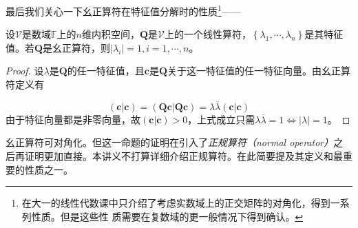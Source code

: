 \documentclass[main.tex]{subfiles}
\begin{document}
最后我们关心一下幺正算符在特征值分解时的性质\footnote{在大一的线性代数课中只介绍了考虑实数域上的正交矩阵的对角化\cite[§5.3 定理 3.7]{周胜林2012线性代数}，得到一系列性质。但是这些性
    质需要在复数域的更一般情况下得到确认。}——
\begin{theorem}
    设$\mathcal{V}$是数域$\mathbb{F}$上的$n$维内积空间，$\mathbf{Q}$是$\mathcal{V}$上的一个线性算符，$\left\{\lambda_1,\cdots,\lambda_n\right\}$是其特征值。若$\mathbf{Q}$是幺正算符，则$\left|\lambda_i\right|=1, i=1,\cdots,n$。
\end{theorem}
\begin{proof}
    设$\lambda$是$\mathbf{Q}$的任一特征值，且$\mathbf{c}$是$\mathbf{Q}$关于这一特征值的任一特征向量。由幺正算符定义有

    \[
        \left(\mathbf{c}|\mathbf{c}\right)=\left(\mathbf{Qc}|\mathbf{Qc}\right)=\lambda\overline{\lambda}\left(\mathbf{c}|\mathbf{c}\right)
    \]
    由于特征向量都是非零向量，故$\left(\mathbf{c}|\mathbf{c}\right)>0$，上式成立只需$\lambda\overline{\lambda}=1\Leftrightarrow\left|\lambda\right|=1$。
\end{proof}

幺正算符可对角化。但这一命题的证明在引入了\emph{正规算符（normal operator）}之后再证明更加直接。本讲义不打算详细介绍正规算符。在此简要提及其定义和最重要的性质之一。
\end{document}

